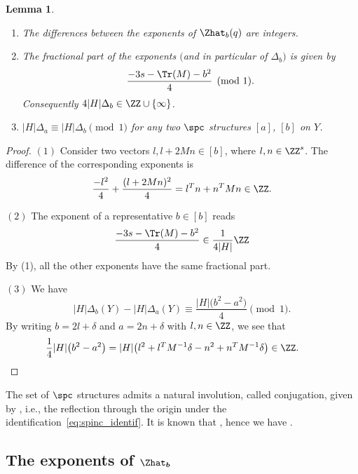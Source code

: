 \documentclass[10pt,a4paper]{amsart}
\newcounter{theorem}
\newtheorem{Lemma}[Theorem]{Lemma}
\begin{document}
\begin{Lemma}%
 \leavevmode
 \begin{enumerate}\itemsep=0pt
 \item[$(1)$] The differences between the exponents of $\Zhat_b(q)$ are integers.
 \item[$(2)$] The fractional part of the exponents $($and in particular of $\Delta_b)$ is given by
 \[
 \frac{-3s - \Tr(M) -b^2}{4} {\pmod{1}}.
 \]
 Consequently $4 \lvert H \rvert \Delta_b \in \ZZ \cup \{\infty\}$.
 \item[$(3)$] $\lvert H\rvert\Delta_a \equiv \lvert H\rvert\Delta_{b} \pmod{1}$ for any two $\spc$ structures $[a]$, $[b]$ on $Y$.
\end{enumerate}
\end{Lemma}

\begin{proof}
$(1)$ Consider two vectors $l, l+2Mn \in [b]$, where $l,n \in \ZZ^s$. The difference of the corresponding exponents is
 \[
 \frac{-l^2}{4}+\frac{(l+2Mn)^2}{4} = l^Tn + n^T Mn \in \ZZ.
 \]

$(2)$ The exponent of a representative $b \in [b]$ reads
 \[
 \frac{-3s - \Tr(M) - b^2}{4} \in \frac{1}{4\lvert H\rvert}\ZZ
 \]
 By (1), all the other exponents have the same fractional part.

$(3)$
 We have
 \[
 \lvert H\rvert\Delta_b(Y) - \lvert H\rvert\Delta_{a}(Y) \equiv \frac{\lvert H\rvert\bigl(b^2 -a^2\bigr)}{4} \pmod{1}.
 \]
 By writing $b = 2l + \delta$ and $a = 2n+\delta$ with $l,n \in \ZZ$, we see that
 \[
 \frac{1}{4}\lvert H\rvert \bigl(b^2 - a^2\bigr) = \lvert H\rvert \bigl(l^2 + l^TM^{-1}\delta - n^2 + n^TM^{-1}\delta\bigr) \in \ZZ.
\tag*{\qed}
\]
\renewcommand{\qed}{}
\end{proof}

\begin{Remark}
The set of $\spc$ structures admits a natural involution, called conjugation, given by \smash{$[b] \mapsto \overline{[b]} := [-b]$}, i.e., the reflection through the origin under the identification~\eqref{eq:spinc_identif}. It is known that , hence we have \smash{$\Delta_{[b]\vphantom{\overline{[b]}}} =\Delta_{\overline{[b]}}$}.
\end{Remark}

\subsection[The exponents of Zhat\_b]{The exponents of $\boldsymbol{\Zhat_b}$}%
\end{document}
